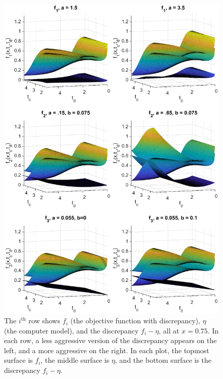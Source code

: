 \documentclass[twocolumn,10pt]{asme2ej}
\begin{document}
\begin{figure}
	\centering
	\includegraphics[scale=0.85]{FIG_six_discrepancies.eps}
	\captionsetup{width=.85\linewidth}
	\caption{The $i^{\text{th}}$ row shows $f_i$ (the objective function with discrepancy), $\eta$ (the computer model), and the discrepancy $f_i-\eta$, all at $x=0.75$. In each row, a less aggressive version of the discrepancy appears on the left, and a more aggressive on the right. In each plot, the topmost surface is $f_i$, the middle surface is $\eta$, and the bottom surface is the discrepancy $f_i-\eta$.}
	\label{fig:discrepancies}
\end{figure}
%
\end{document}
